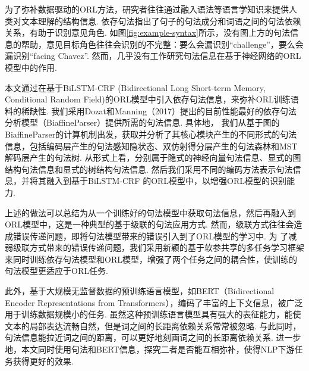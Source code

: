 为了弥补数据驱动的ORL方法，研究者往往通过融入语法等语言学知识来提供人类对文本理解的结构信息. 依存句法指出了句子的句法成分和词语之间的句法依赖关系，有助于识别意见角色. 如图\ref{fig:example-syntax}所示，没有图上方的句法信息的帮助，意见目标角色往往会识别的不完整：要么会漏识别“challenge”，要么会漏识别“facing Chavez”.
然而，几乎没有工作研究句法信息在基于神经网络的ORL模型中的作用.

本文通过在基于BiLSTM-CRF (Bidirectional Long Short-term Memory, Conditional Random Field)的ORL模型中引入依存句法信息，来弥补ORL训练语料的稀缺性.
我们采用Dozat和Manning（2017）提出的目前性能最好的依存句法分析模型（BiaffineParser）提供所需的句法信息. 具体地，
我们从基于图的BiaffineParser的计算机制出发，获取并分析了其核心模块产生的不同形式的句法信息，包括编码层产生的句法感知隐状态、双仿射得分层产生的句法森林和MST解码层产生的句法树.
从形式上看，分别属于隐式的神经向量句法信息、显式的图结构句法信息和显式的树结构句法信息.
然后我们采用不同的编码方法表示句法信息，并将其融入到基于BiLSTM-CRF 的ORL模型中，以增强ORL模型的识别能力.

上述的做法可以总结为从一个训练好的句法模型中获取句法信息，然后再融入到ORL模型中，这是一种典型的基于级联的句法应用方式.
然而，级联方式往往会造成错误传递问题，即将句法模型带来的错误引入到了ORL模型的学习中. 为
了减弱级联方式带来的错误传递问题，我们采用新颖的基于软参共享的多任务学习框架来同时训练依存句法模型和ORL模型，增强了两个任务之间的耦合性，使训练的句法模型更适应于ORL任务.

此外，基于大规模无监督数据的预训练语言模型，如BERT（Bidirectional Encoder Representations from Transformers），编码了丰富的上下文信息，被广泛用于训练数据规模小的任务.
虽然这种预训练语言模型具有强大的表征能力，能使文本的局部表达流畅自然，但是词之间的长距离依赖关系常常被忽略.
与此同时，句法信息能拉近词之间的距离，可以更好地刻画词之间的长距离依赖关系.
进一步地，本文同时使用句法和BERT信息，探究二者是否能互相弥补，使得NLP下游任务获得更好的效果.

